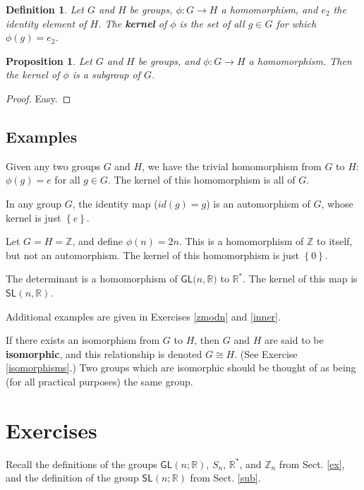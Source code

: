 \documentclass{amsbook}
\theoremstyle{plain}
\newtheorem{definition}[theorem]{Definition}
\newtheorem{proposition}[theorem]{Proposition}
\numberwithin{equation}{chapter}
\numberwithin{theorem}{chapter}
\begin{document}
\begin{definition}
Let $G$ and $H$ be groups, $\phi:G\rightarrow H$ a homomorphism, and $e_{2}$
the identity element of $H$. The \textbf{kernel} of $\phi$ is the set of all
$g\in G$ for which $\phi(g)=e_{2}$.
\end{definition}

\begin{proposition}
Let $G$ and $H$ be groups, and $\phi:G\rightarrow H$ a homomorphism. Then the
kernel of $\phi$ is a subgroup of $G$.
\end{proposition}

\begin{proof}
Easy.
\end{proof}

\subsection{Examples}

Given any two groups $G$ and $H$, we have the trivial homomorphism from $G$ to
$H$: $\phi(g)=e$ for all $g\in G$. The kernel of this homomorphism is all of
$G$.

In any group $G$, the identity map ($id(g)=g$) is an automorphism of $G$,
whose kernel is just $\left\{  e\right\}  $.

Let $G=H=\mathbb{Z}$, and define $\phi(n)=2n$. This is a homomorphism of
$\mathbb{Z}$ to itself, but not an automorphism. The kernel of this
homomorphism is just $\left\{  0\right\}  $.

The determinant is a homomorphism of $\mathsf{GL}(n,\mathbb{R}\mathbf{)}$ to
$\mathbb{R}^{*}$. The kernel of this map is $\mathsf{SL}\left(  n,\mathbb{R}%
\right)  $.

Additional examples are given in Exercises \ref{zmodn} and \ref{inner}.

If there exists an isomorphism from $G$ to $H$, then $G$ and $H$ are said to
be \textbf{isomorphic}, and this relationship is denoted $G\cong H$. (See
Exercise \ref{isomorphisms}.) Two groups which are isomorphic should be
thought of as being (for all practical purposes) the same group.

\section{Exercises}

Recall the definitions of the groups $\mathsf{GL}(n;\mathbb{R})$, $S_{n}$,
$\mathbb{R}^{*}$, and $\mathbb{Z}_{n}$ from Sect. \ref{ex}, and the definition
of the group $\mathsf{SL}(n;\mathbb{R})$ from Sect. \ref{sub}.
\end{document}
